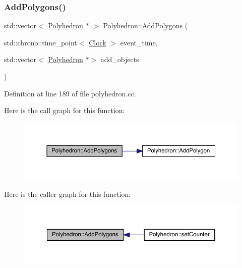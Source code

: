 \subsubsection{\texorpdfstring{Add\+Polygons()}{AddPolygons()}}
{\footnotesize\ttfamily std\+::vector$<$ \hyperlink{class_polyhedron}{Polyhedron} $\ast$ $>$ Polyhedron\+::\+Add\+Polygons (\begin{DoxyParamCaption}\item[{std\+::chrono\+::time\+\_\+point$<$ \hyperlink{universe_8h_a0ef8d951d1ca5ab3cfaf7ab4c7a6fd80}{Clock} $>$}]{event\+\_\+time,  }\item[{std\+::vector$<$ \hyperlink{class_polyhedron}{Polyhedron} $\ast$$>$}]{add\+\_\+objects }\end{DoxyParamCaption})}



Definition at line 189 of file polyhedron.\+cc.

Here is the call graph for this function\+:
\nopagebreak
\begin{figure}[H]
\begin{center}
\leavevmode
\includegraphics[width=350pt]{class_polyhedron_a9564a286e7323b56667971b851f0674a_cgraph}
\end{center}
\end{figure}
Here is the caller graph for this function\+:
\nopagebreak
\begin{figure}[H]
\begin{center}
\leavevmode
\includegraphics[width=350pt]{class_polyhedron_a9564a286e7323b56667971b851f0674a_icgraph}
\end{center}
\end{figure}
\mbox{\label{class_polyhedron_abfacad3a348785dab8819e70bf92d8d1}} 
